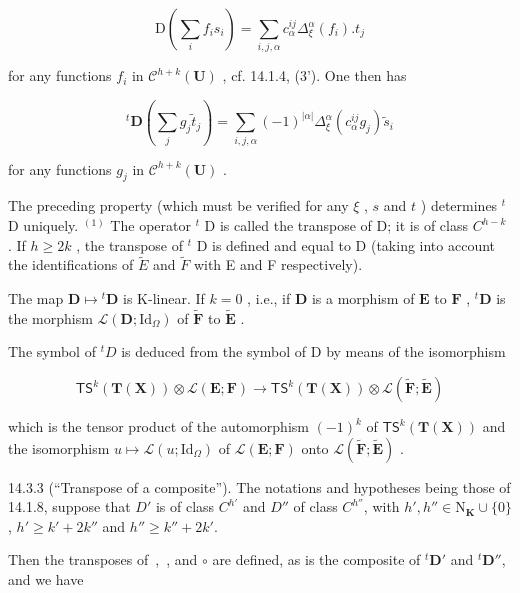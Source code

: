 \[
\mathrm{D} \left(\sum_ {i} f _ {i} s _ {i}\right) = \sum_ {i, j, \alpha} c _ {\alpha} ^ {i j} \Delta_ {\xi} ^ {\alpha} (f _ {i}). t _ {j}
\]

for any functions \(f_{i}\) in \(\mathcal{C}^{h+k}(\mathbf{U})\) , cf. 14.1.4, (3'). One then has

\[
{ } ^ { t } \mathbf { D } \left( \sum _ { j } g _ { j } \tilde { t } _ { j } \right) = \sum _ { i , j , \alpha } ( - 1 ) ^ { | \alpha | } \Delta _ { \xi } ^ { \alpha } ( c _ { \alpha } ^ { i j } g _ { j } ) \tilde { s } _ { i }
\]

for any functions \(g_{j}\) in \(\mathcal{C}^{h+k}(\mathbf{U})\) .

The preceding property (which must be verified for any \(\xi\) , \(s\) and \(t\) ) determines \(^{t}\) D uniquely. \(^{(1)}\) The operator \(^{t}\) D is called the transpose of D; it is of class \(C^{h-k}\) . If \(h \geqslant 2k\) , the transpose of \(^{t}\) D is defined and equal to D (taking into account the identifications of \(\tilde{E}\) and \(\tilde{F}\) with E and F respectively).

The map \(\mathbf{D} \mapsto {}^t\mathbf{D}\) is K-linear. If \(k = 0\) , i.e., if \(\mathbf{D}\) is a morphism of \(\mathbf{E}\) to \(\mathbf{F}\) , \({}^t\mathbf{D}\) is the morphism \(\mathcal{L}(\mathbf{D}; \mathrm{Id}_{\Omega})\) of \(\tilde{\mathbf{F}}\) to \(\tilde{\mathbf{E}}\) .

The symbol of \({}^{t}D\) is deduced from the symbol of D by means of the isomorphism

\[
\mathsf {T S} ^ {k} (\mathbf {T} (\mathbf {X})) \otimes \mathscr {L} (\mathbf {E}; \mathbf {F}) \rightarrow \mathsf {T S} ^ {k} (\mathbf {T} (\mathbf {X})) \otimes \mathscr {L} (\tilde {\mathbf {F}}; \tilde {\mathbf {E}})
\]

which is the tensor product of the automorphism \((-1)^{k}\) of \(\mathsf{T}\mathsf{S}^{k}(\mathbf{T}(\mathbf{X}))\) and the isomorphism \(u\mapsto\mathcal{L}(u;\mathrm{Id}_{\Omega})\) of \(\mathcal{L}(\mathbf{E};\mathbf{F})\) onto \(\mathcal{L}(\tilde{\mathbf{F}};\tilde{\mathbf{E}})\) .

14.3.3 (“Transpose of a composite”). The notations and hypotheses being those of 14.1.8, suppose that \(D'\) is of class \(C^{h'}\) and \(D''\) of class \(C^{h''}\), with \(h',h'' \in \mathrm{N}_{\mathbf{K}} \cup \{0\}\), \(h' \geqslant k' + 2k''\) and \(h'' \geqslant k'' + 2k'\).

Then the transposes of \,, \,, and \(\circ\) are defined, as is the composite of \(^t\mathbf{D}'\) and \(^t\mathbf{D}''\), and we have


